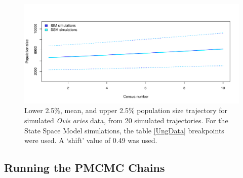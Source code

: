 \documentclass[a4paper,12pt]{article}
\begin{document}
\begin{figure}[H]
\centering
\includegraphics[scale=0.65]{ungData49.pdf}
\caption{\label{ungFlat49}Lower 2.5\%, mean, and upper 2.5\% population size trajectory for simulated \textit{Ovis aries} data, from 20 simulated trajectories. For the State Space Model simulations, the table \ref{UngData} breakpoints were used. A `shift' value of 0.49 was used.}
\end{figure}

\subsection{Running the PMCMC Chains}
\end{document}
